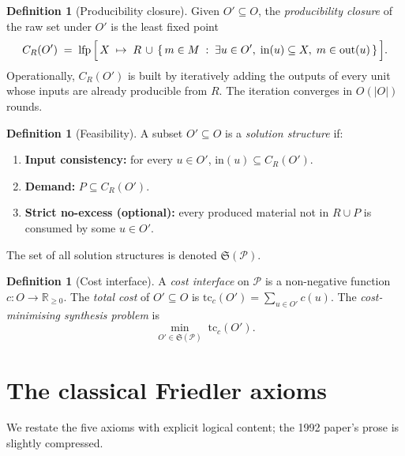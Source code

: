 \documentclass[11pt,a4paper]{article}
\theoremstyle{plain}
\theoremstyle{definition}
\newtheorem{definition}[theorem]{Definition}
\newcommand{\closer}[1]{C_R(#1)}
\newcommand{\Real}{\mathbb{R}}
\newcommand{\Realp}{\Real_{\geq 0}}
\newcommand{\inset}[1]{\mathrm{in}(#1)}
\newcommand{\outset}[1]{\mathrm{out}(#1)}
\begin{document}
\begin{definition}[Producibility closure]
\label{def:closure}
Given $O' \subseteq O$, the \emph{producibility closure} of the raw
set under $O'$ is the least fixed point
\[
\closer{O'} \;=\; \mathrm{lfp}\,\Bigl[\,X \;\mapsto\; R \,\cup\,
                \{\,m \in M \;:\; \exists u \in O',\; \inset{u} \subseteq X,\; m \in \outset{u}\,\}\,\Bigr].
\]
Operationally, $\closer{O'}$ is built by iteratively adding the
outputs of every unit whose inputs are already producible from $R$.
The iteration converges in $O(|O|)$ rounds.
\end{definition}

\begin{definition}[Feasibility]
\label{def:feasible}
A subset $O' \subseteq O$ is a \emph{solution structure} if:
\begin{enumerate}[label=(\alph*)]
\item \textbf{Input consistency:} for every $u \in O'$,
      $\inset{u} \subseteq \closer{O'}$.
\item \textbf{Demand:} $P \subseteq \closer{O'}$.
\item \textbf{Strict no-excess (optional):} every produced material
      not in $R \cup P$ is consumed by some $u \in O'$.
\end{enumerate}
The set of all solution structures is denoted $\mathfrak{S}(\mathcal{P})$.
\end{definition}

\begin{definition}[Cost interface]
\label{def:cost}
A \emph{cost interface} on $\mathcal{P}$ is a non-negative function
$c : O \to \Realp$. The \emph{total cost} of $O' \subseteq O$ is
$
\mathrm{tc}_c(O') = \sum_{u \in O'} c(u).
$
The \emph{cost-minimising synthesis problem} is
\begin{equation}
\label{eq:scalar-objective}
\min_{O' \in \mathfrak{S}(\mathcal{P})}\; \mathrm{tc}_c(O').
\end{equation}
\end{definition}

\section{The classical Friedler axioms}
\label{sec:classical}

We restate the five axioms with explicit logical content; the
1992 paper's prose is slightly compressed.
\end{document}
